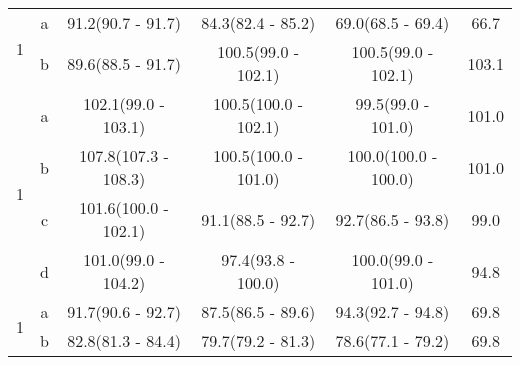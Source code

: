 \begin{table}[H]
\begin{tabular}{c|c|c|c|c|c}
\multirow{2}{*}{1} & a & 91.2(90.7 - 91.7) & 84.3(82.4 - 85.2) & 69.0(68.5 - 69.4) & 66.7\\ 
 & b & 89.6(88.5 - 91.7) & 100.5(99.0 - 102.1) & 100.5(99.0 - 102.1) & 103.1\\ 
\hline

\multirow{4}{*}{1} & a & 102.1(99.0 - 103.1) & 100.5(100.0 - 102.1) & 99.5(99.0 - 101.0) & 101.0\\ 
 & b & 107.8(107.3 - 108.3) & 100.5(100.0 - 101.0) & 100.0(100.0 - 100.0) & 101.0\\ 
 & c & 101.6(100.0 - 102.1) & 91.1(88.5 - 92.7) & 92.7(86.5 - 93.8) & 99.0\\ 
 & d & 101.0(99.0 - 104.2) & 97.4(93.8 - 100.0) & 100.0(99.0 - 101.0) & 94.8\\ 
\hline

\multirow{2}{*}{1} & a & 91.7(90.6 - 92.7) & 87.5(86.5 - 89.6) & 94.3(92.7 - 94.8) & 69.8\\ 
 & b & 82.8(81.3 - 84.4) & 79.7(79.2 - 81.3) & 78.6(77.1 - 79.2) & 69.8\\ 
\hline


		\hline\hline
		
	\end{tabular}
	\label{tab:resultsComplex}
\end{table}

\newpage


